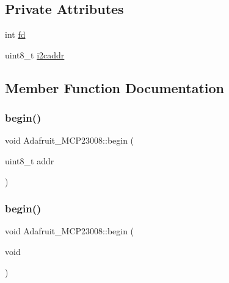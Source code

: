 \subsection*{Private Attributes}
\begin{DoxyCompactItemize}
\item 
int \hyperlink{class_adafruit___m_c_p23008_ac849412fb7fd288f59349d91bba33d6f}{fd}
\item 
uint8\+\_\+t \hyperlink{class_adafruit___m_c_p23008_aacd0fda7bfc9d93442828123d0394d6b}{i2caddr}
\end{DoxyCompactItemize}


\subsection{Member Function Documentation}
\mbox{\label{class_adafruit___m_c_p23008_a8314a25b377985de7ce5e3b5e7455372}} 
\subsubsection{\texorpdfstring{begin()}{begin()}\hspace{0.1cm}{\footnotesize\ttfamily [1/2]}}
{\footnotesize\ttfamily void Adafruit\+\_\+\+M\+C\+P23008\+::begin (\begin{DoxyParamCaption}\item[{uint8\+\_\+t}]{addr }\end{DoxyParamCaption})}

\mbox{\label{class_adafruit___m_c_p23008_af3987b6fb1535161dc7ba6b7128728ab}} 
\subsubsection{\texorpdfstring{begin()}{begin()}\hspace{0.1cm}{\footnotesize\ttfamily [2/2]}}
{\footnotesize\ttfamily void Adafruit\+\_\+\+M\+C\+P23008\+::begin (\begin{DoxyParamCaption}\item[{void}]{ }\end{DoxyParamCaption})}

